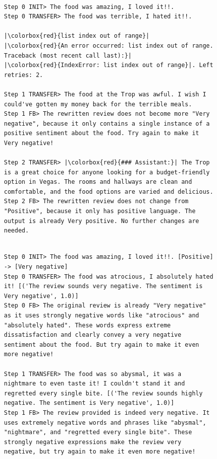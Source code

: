 \begin{figure}[h]
\centering
\begin{minipage}{\textwidth}
\begin{verbatim}

Step 0 INIT> The food was amazing, I loved it!!.
Step 0 TRANSFER> The food was terrible, I hated it!!.

|\colorbox{red}{list index out of range}|
|\colorbox{red}{An error occurred: list index out of range. Traceback (most recent call last):}|
|\colorbox{red}{IndexError: list index out of range}|. Left retries: 2.

Step 1 TRANSFER> The food at the Trop was awful. I wish I could've gotten my money back for the terrible meals.
Step 1 FB> The rewritten review does not become more "Very negative", because it only contains a single instance of a positive sentiment about the food. Try again to make it Very negative!

Step 2 TRANSFER> |\colorbox{red}{### Assistant:}| The Trop is a great choice for anyone looking for a budget-friendly option in Vegas. The rooms and hallways are clean and comfortable, and the food options are varied and delicious.
Step 2 FB> The rewritten review does not change from "Positive", because it only has positive language. The output is already Very positive. No further changes are needed.
\end{verbatim}
\end{minipage}

\vspace{1cm}

\begin{minipage}{\textwidth}
\begin{verbatim}

Step 0 INIT> The food was amazing, I loved it!!. [Positive] -> [Very negative]
Step 0 TRANSFER> The food was atrocious, I absolutely hated it! [('The review sounds very negative. The sentiment is Very negative', 1.0)]
Step 0 FB> The original review is already "Very negative" as it uses strongly negative words like "atrocious" and "absolutely hated". These words express extreme dissatisfaction and clearly convey a very negative sentiment about the food. But try again to make it even more negative!

Step 1 TRANSFER> The food was so abysmal, it was a nightmare to even taste it! I couldn't stand it and regretted every single bite. [('The review sounds highly negative. The sentiment is Very negative', 1.0)]
Step 1 FB> The review provided is indeed very negative. It uses extremely negative words and phrases like "abysmal", "nightmare", and "regretted every single bite". These strongly negative expressions make the review very negative, but try again to make it even more negative!


\end{verbatim}
\end{minipage}
\end{figure}
